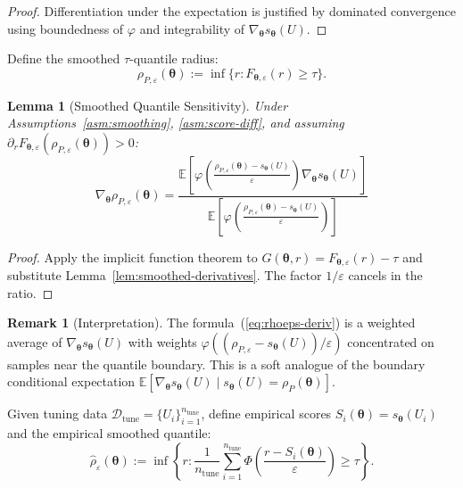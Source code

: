 \documentclass[lettersize,journal]{IEEEtran}
\newcommand{\E}{\mathbb{E}}
\newcommand{\cD}{\mathcal{D}}
\newcommand{\btheta}{\bm{\theta}}
\newtheorem{lemma}[theorem]{Lemma}
\theoremstyle{definition}
\newtheorem{remark}{Remark}
\begin{document}
\begin{proof}
Differentiation under the expectation is justified by dominated convergence using boundedness of $\varphi$ and integrability of $\nabla_{\btheta} s_{\btheta}(U)$.
\end{proof}

Define the smoothed $\tau$-quantile radius:
\begin{equation}
\rho_{P,\varepsilon}(\btheta) := \inf\{r : F_{\btheta,\varepsilon}(r) \geq \tau\}.
\end{equation}

\begin{lemma}[Smoothed Quantile Sensitivity]\label{lem:smoothed-quantile-deriv}
Under Assumptions~\ref{asm:smoothing}, \ref{asm:score-diff}, and assuming $\partial_r F_{\btheta,\varepsilon}(\rho_{P,\varepsilon}(\btheta)) > 0$:
\begin{equation}\label{eq:rhoeps-deriv}
\nabla_{\btheta} \rho_{P,\varepsilon}(\btheta) = \frac{\E\left[\varphi\left(\frac{\rho_{P,\varepsilon}(\btheta) - s_{\btheta}(U)}{\varepsilon}\right) \nabla_{\btheta} s_{\btheta}(U)\right]}{\E\left[\varphi\left(\frac{\rho_{P,\varepsilon}(\btheta) - s_{\btheta}(U)}{\varepsilon}\right)\right]}
\end{equation}
\end{lemma}

\begin{proof}
Apply the implicit function theorem to $G(\btheta,r) = F_{\btheta,\varepsilon}(r) - \tau$ and substitute Lemma~\ref{lem:smoothed-derivatives}. The factor $1/\varepsilon$ cancels in the ratio.
\end{proof}

\begin{remark}[Interpretation]
The formula~(\ref{eq:rhoeps-deriv}) is a weighted average of $\nabla_{\btheta} s_{\btheta}(U)$ with weights $\varphi((\rho_{P,\varepsilon} - s_{\btheta}(U))/\varepsilon)$ concentrated on samples near the quantile boundary. This is a soft analogue of the boundary conditional expectation $\E[\nabla_{\btheta} s_{\btheta}(U) \mid s_{\btheta}(U) = \rho_P(\btheta)]$.
\end{remark}

Given tuning data $\cD_{\text{tune}} = \{U_i\}_{i=1}^{n_{\text{tune}}}$, define empirical scores $S_i(\btheta) = s_{\btheta}(U_i)$ and the empirical smoothed quantile:
\begin{equation}
\hat{\rho}_\varepsilon(\btheta) := \inf\left\{r : \frac{1}{n_{\text{tune}}} \sum_{i=1}^{n_{\text{tune}}} \Phi\left(\frac{r - S_i(\btheta)}{\varepsilon}\right) \geq \tau\right\}.
\end{equation}
\end{document}
